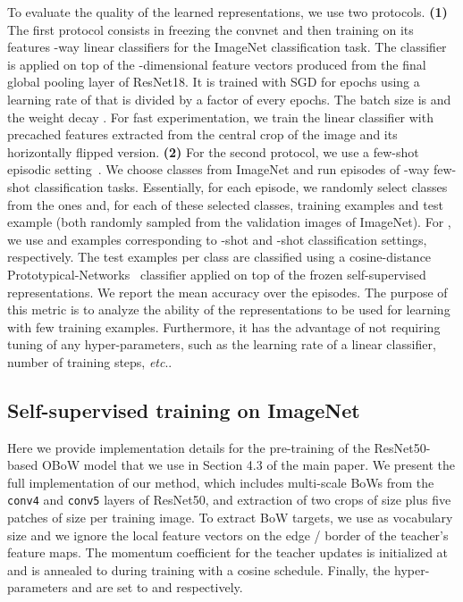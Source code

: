 \documentclass[final]{cvpr}
\makeatletter
\newcommand{\resnetfifty}{ResNet50\xspace}
\DeclareRobustCommand\onedot{\futurelet\@let@token\@onedot}
\def\@onedot{\ifx\@let@token.\else.\null\fi\xspace}
\def\etc{\emph{etc}\onedot} \def\vs{\emph{vs}\onedot}
\makeatother
\begin{document}
To evaluate the quality of the learned representations, we use two protocols.
\textbf{(1)} The first protocol consists in freezing the convnet and then training on its features -way linear classifiers for the ImageNet classification task.
The classifier is applied on top of the -dimensional feature vectors produced from the final global pooling layer of ResNet18.
It is trained with SGD for  epochs using a learning rate of  that is divided by a factor of  every  epochs.
The batch size is  and the weight decay . 
For fast experimentation, we train the linear classifier with precached features extracted from the  central crop of the image and its horizontally flipped version. 
\textbf{(2)}
For the second protocol, we use a few-shot episodic setting~\cite{vinyals2016matching}. 
We choose  classes from ImageNet and run  episodes of -way few-shot classification tasks.
Essentially, for each episode, we randomly select  classes from the  ones and, for each of these selected classes,  training examples and  test example (both randomly sampled from the validation images of ImageNet). 
For , we use  and  examples corresponding to -shot and -shot classification settings, respectively.
The  test examples per class are classified using a cosine-distance Prototypical-Networks~\cite{snell2017prototypical} classifier applied on top of the frozen self-supervised representations. We report the mean accuracy over the  episodes.
The purpose of this metric is to analyze the ability of the representations to be used for learning with few training examples.
Furthermore, it has the advantage of not requiring tuning of any hyper-parameters, such as the learning rate of a linear classifier, number of training steps, \etc

\subsection{Self-supervised training on ImageNet}

Here we provide implementation details for the pre-training of the \resnetfifty-based OBoW model that we use in Section 4.3 of the main paper.
We present the full implementation of our method, which includes multi-scale BoWs from the \texttt{conv4} and \texttt{conv5} layers of \resnetfifty, and extraction of two crops of size  plus five
patches of size  per training image.
To extract BoW targets, 
we use  as vocabulary size and we ignore the local feature vectors on the edge / border of the teacher's feature maps. 
The momentum coefficient  for the teacher updates is initialized at  and is annealed to  during training with a cosine schedule.
Finally, the hyper-parameters  and  are set to  and  respectively.
\end{document}
